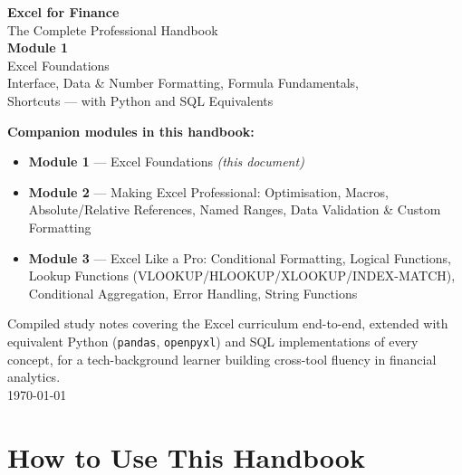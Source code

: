 \documentclass[11pt,a4paper]{article}
\begin{document}
\begin{titlepage}
\centering
\vspace*{1.5cm}
{\Huge\bfseries\color{excelgreen} Excel for Finance}\\[0.4cm]
{\Large The Complete Professional Handbook}\\[1.2cm]
{\huge\bfseries Module 1}\\[0.3cm]
{\LARGE Excel Foundations}\\[0.15cm]
{\large Interface, Data \& Number Formatting, Formula Fundamentals,\\ Shortcuts --- with Python and SQL Equivalents}\\[2cm]

\begin{tcolorbox}[colback=excelgreenlight, colframe=excelgreen, width=0.8\textwidth, arc=3pt]
\textbf{Companion modules in this handbook:}
\begin{itemize}[leftmargin=1.5em]
  \item \textbf{Module 1} --- Excel Foundations \textit{(this document)}
  \item \textbf{Module 2} --- Making Excel Professional: Optimisation, Macros, Absolute/Relative References, Named Ranges, Data Validation \& Custom Formatting
  \item \textbf{Module 3} --- Excel Like a Pro: Conditional Formatting, Logical Functions, Lookup Functions (VLOOKUP/HLOOKUP/XLOOKUP/INDEX-MATCH), Conditional Aggregation, Error Handling, String Functions
\end{itemize}
\end{tcolorbox}

\vfill
{\small Compiled study notes covering the Excel curriculum end-to-end, extended with equivalent Python (\texttt{pandas}, \texttt{openpyxl}) and SQL implementations of every concept, for a tech-background learner building cross-tool fluency in financial analytics.}\\[0.3cm]
{\small \today}
\end{titlepage}

\tableofcontents
\newpage

\section{How to Use This Handbook}
\end{document}
